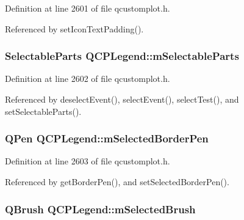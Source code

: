 Definition at line 2601 of file qcustomplot.\+h.



Referenced by set\+Icon\+Text\+Padding().

\hypertarget{class_q_c_p_legend_a179b4d5c1bea723b76e402ff48f0d7fb}{}
\subsubsection[{m\+Selectable\+Parts}]{\setlength{\rightskip}{0pt plus 5cm}Selectable\+Parts Q\+C\+P\+Legend\+::m\+Selectable\+Parts\hspace{0.3cm}{\ttfamily [protected]}}\label{class_q_c_p_legend_a179b4d5c1bea723b76e402ff48f0d7fb}


Definition at line 2602 of file qcustomplot.\+h.



Referenced by deselect\+Event(), select\+Event(), select\+Test(), and set\+Selectable\+Parts().

\hypertarget{class_q_c_p_legend_a62906c996906ae23e9f724b6ac1f7334}{}
\subsubsection[{m\+Selected\+Border\+Pen}]{\setlength{\rightskip}{0pt plus 5cm}Q\+Pen Q\+C\+P\+Legend\+::m\+Selected\+Border\+Pen\hspace{0.3cm}{\ttfamily [protected]}}\label{class_q_c_p_legend_a62906c996906ae23e9f724b6ac1f7334}


Definition at line 2603 of file qcustomplot.\+h.



Referenced by get\+Border\+Pen(), and set\+Selected\+Border\+Pen().

\hypertarget{class_q_c_p_legend_ab3c7567c86d4784b1e48f76a84b3a1e2}{}
\subsubsection[{m\+Selected\+Brush}]{\setlength{\rightskip}{0pt plus 5cm}Q\+Brush Q\+C\+P\+Legend\+::m\+Selected\+Brush\hspace{0.3cm}{\ttfamily [protected]}}\label{class_q_c_p_legend_ab3c7567c86d4784b1e48f76a84b3a1e2}


